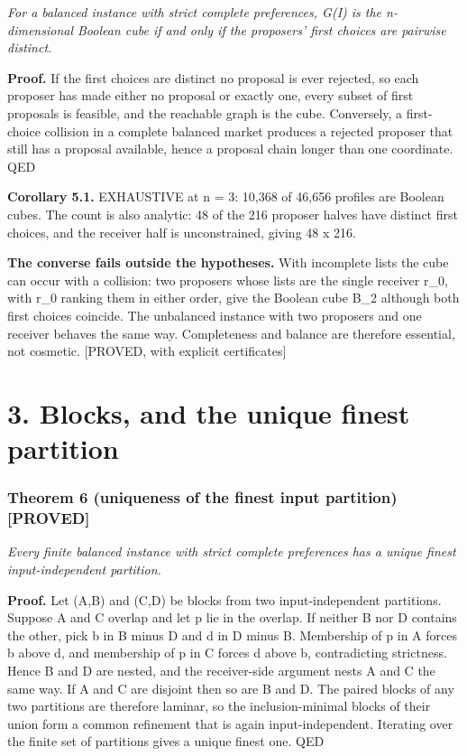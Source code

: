 \documentclass[
  11pt,
]{article}
\begin{document}
\emph{For a balanced instance with strict complete preferences, G(I) is
the n-dimensional Boolean cube if and only if the proposers' first
choices are pairwise distinct.}

\textbf{Proof.} If the first choices are distinct no proposal is ever
rejected, so each proposer has made either no proposal or exactly one,
every subset of first proposals is feasible, and the reachable graph is
the cube. Conversely, a first-choice collision in a complete balanced
market produces a rejected proposer that still has a proposal available,
hence a proposal chain longer than one coordinate. QED

\textbf{Corollary 5.1.} EXHAUSTIVE at n = 3: 10,368 of 46,656 profiles
are Boolean cubes. The count is also analytic: 48 of the 216 proposer
halves have distinct first choices, and the receiver half is
unconstrained, giving 48 x 216.

\textbf{The converse fails outside the hypotheses.} With incomplete
lists the cube can occur with a collision: two proposers whose lists are
the single receiver r\_0, with r\_0 ranking them in either order, give
the Boolean cube B\_2 although both first choices coincide. The
unbalanced instance with two proposers and one receiver behaves the same
way. Completeness and balance are therefore essential, not cosmetic.
{[}PROVED, with explicit certificates{]}

\clearpage

\hypertarget{blocks-and-the-unique-finest-partition}{%
\section{3. Blocks, and the unique finest
partition}\label{blocks-and-the-unique-finest-partition}}

\hypertarget{theorem-6-uniqueness-of-the-finest-input-partition-proved}{%
\subsubsection{Theorem 6 (uniqueness of the finest input partition)
{[}PROVED{]}}\label{theorem-6-uniqueness-of-the-finest-input-partition-proved}}

\emph{Every finite balanced instance with strict complete preferences
has a unique finest input-independent partition.}

\textbf{Proof.} Let (A,B) and (C,D) be blocks from two input-independent
partitions. Suppose A and C overlap and let p lie in the overlap. If
neither B nor D contains the other, pick b in B minus D and d in D minus
B. Membership of p in A forces b above d, and membership of p in C
forces d above b, contradicting strictness. Hence B and D are nested,
and the receiver-side argument nests A and C the same way. If A and C
are disjoint then so are B and D. The paired blocks of any two
partitions are therefore laminar, so the inclusion-minimal blocks of
their union form a common refinement that is again input-independent.
Iterating over the finite set of partitions gives a unique finest one.
QED
\end{document}

